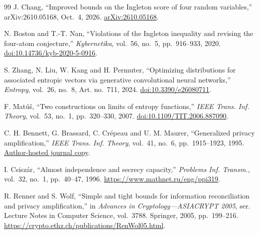 \documentclass[a4paper,11pt]{article}
\begin{document}
\begin{thebibliography}{99}
J. Chang, ``Improved bounds on the Ingleton score of four random variables,''
arXiv:2610.05168, Oct.~4, 2026.
\href{https://arxiv.org/abs/2610.05168}{arXiv:2610.05168}.

N. Boston and T.-T. Nan,
``Violations of the Ingleton inequality and revising the four-atom conjecture,''
\emph{Kybernetika}, vol.~56, no.~5, pp.~916--933, 2020.
\href{https://doi.org/10.14736/kyb-2020-5-0916}{doi:10.14736/kyb-2020-5-0916}.

S. Zhang, N. Liu, W. Kang and H. Permuter,
``Optimizing distributions for associated entropic vectors via generative convolutional neural networks,''
\emph{Entropy}, vol.~26, no.~8, Art. no.~711, 2024.
\href{https://doi.org/10.3390/e26080711}{doi:10.3390/e26080711}.

F. Mat\'u\v{s}, ``Two constructions on limits of entropy functions,''
\emph{IEEE Trans. Inf. Theory}, vol.~53, no.~1, pp.~320--330, 2007.
\href{https://doi.org/10.1109/TIT.2006.887090}{doi:10.1109/TIT.2006.887090}.

C. H. Bennett, G. Brassard, C. Cr\'epeau and U. M. Maurer,
``Generalized privacy amplification,''
\emph{IEEE Trans. Inf. Theory}, vol.~41, no.~6, pp.~1915--1923, 1995.
\href{https://crypto.cs.mcgill.ca/~crepeau/PDF/ASPUBLISHED/BBCM95.pdf}{Author-hosted journal copy}.

I. Csisz\'ar, ``Almost independence and secrecy capacity,''
\emph{Problems Inf. Transm.}, vol.~32, no.~1, pp.~40--47, 1996.
\url{https://www.mathnet.ru/eng/ppi319}.

R. Renner and S. Wolf,
``Simple and tight bounds for information reconciliation and privacy amplification,''
in \emph{Advances in Cryptology---ASIACRYPT 2005}, ser. Lecture Notes in Computer Science, vol.~3788. Springer, 2005, pp.~199--216.
\url{https://crypto.ethz.ch/publications/RenWol05.html}.
\end{thebibliography}
\end{document}
